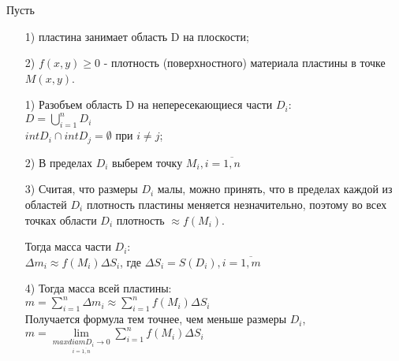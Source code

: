 Пусть
\begin{enumerate}
\item[1)] 
пластина занимает область D на плоскости;

\item[2)] 
$f(x,y) \geqslant 0$ - плотность (поверхностного) материала пластины в точке $M(x,y)$.
\end{enumerate}


\begin{enumerate}
\item[1)]
Разобъем область D на непересекающиеся части $D_i$: \\
$D = \bigcup\limits_{i = 1}^{n} D_i$ \\
$int D_i \cap int D_j = \emptyset$ при $i \neq j$;

\item[2)]
В пределах $D_i$ выберем точку $M_i, i = \overline{1,n}$

\item[3)] 
Считая, что размеры $D_i$ малы, можно принять, что в пределах каждой из областей $D_i$ плотность пластины меняется незначительно, поэтому во всех точках области $D_i$ плотность $\approx f(M_i)$.

Тогда масса части $D_i$: \\
$\Delta m_i \approx f(M_i) \Delta S_i$, где $\Delta S_i = S(D_i), i = \overline{1,m}$

\item[4)]
Тогда масса всей пластины: \\
$m = \sum\limits_{i = 1}^{n} \Delta m_i \approx \sum\limits_{i = 1}^{n} f(M_i) \Delta S_i$ \\
Получается формула тем точнее, чем меньше размеры $D_i$, \\
$m = \lim\limits_{\underset{i = \overline{1,n}}{max diam D_i \rightarrow 0}} \sum\limits_{i = 1}^{n} f(M_i) \Delta S_i$
\end{enumerate}















